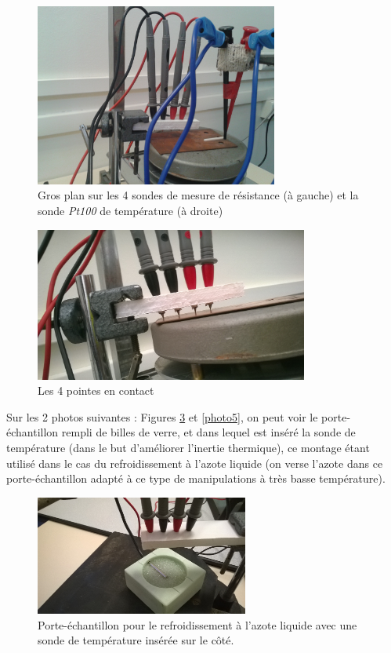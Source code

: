 \newpage

\begin{figure}[!t]
  \begin{center}
		\includegraphics[width=8cm]{./images/photo2.jpg}
		\caption{Gros plan sur les 4 sondes de mesure de résistance (à gauche) et la sonde \emph{Pt100} de température (à droite)}
		\label{photo2}
	\end{center}
\end{figure}
\begin{figure}[h]
  \begin{center}
		\includegraphics[width=9cm]{./images/photo3.jpg}
		\caption{Les 4 pointes en contact}
		\label{photo3}
	\end{center}
\end{figure}

Sur les 2 photos suivantes : Figures \ref{photo4} et \ref{photo5}, on peut voir le porte-échantillon rempli de billes 
de verre, et dans lequel est inséré la sonde de température (dans le but d'améliorer l'inertie thermique), ce montage étant utilisé dans le cas du refroidissement à l'azote liquide (on verse l'azote dans ce porte-échantillon adapté à ce type de manipulations à très basse température).

\newpage

\begin{figure}[!t]
  \begin{center}
		\includegraphics[width=7cm]{./images/photo4.jpg}
		\caption{Porte-échantillon pour le refroidissement à l'azote liquide avec une sonde de température insérée sur le côté.}
		\label{photo4}
	\end{center}
\end{figure}

